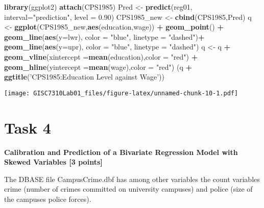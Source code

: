 \documentclass[
]{article}
\newenvironment{Shaded}{\begin{snugshade}}{\end{snugshade}}
\newcommand{\DataTypeTok}[1]{\textcolor[rgb]{0.13,0.29,0.53}{#1}}
\newcommand{\FloatTok}[1]{\textcolor[rgb]{0.00,0.00,0.81}{#1}}
\newcommand{\KeywordTok}[1]{\textcolor[rgb]{0.13,0.29,0.53}{\textbf{#1}}}
\newcommand{\NormalTok}[1]{#1}
\newcommand{\OperatorTok}[1]{\textcolor[rgb]{0.81,0.36,0.00}{\textbf{#1}}}
\newcommand{\StringTok}[1]{\textcolor[rgb]{0.31,0.60,0.02}{#1}}
\begin{document}
\begin{Shaded}
\begin{Highlighting}[]
\KeywordTok{library}\NormalTok{(ggplot2)}
\KeywordTok{attach}\NormalTok{(CPS1985)}
\NormalTok{Pred <-}\StringTok{ }\KeywordTok{predict}\NormalTok{(reg01, }\DataTypeTok{interval=}\StringTok{"prediction"}\NormalTok{, }\DataTypeTok{level =} \FloatTok{0.90}\NormalTok{)}
\NormalTok{CPS1985_new <-}\StringTok{ }\KeywordTok{cbind}\NormalTok{(CPS1985,Pred)}
\NormalTok{q <-}\StringTok{ }\KeywordTok{ggplot}\NormalTok{(CPS1985_new,}\KeywordTok{aes}\NormalTok{(education,wage)) }\OperatorTok{+}\StringTok{ }\KeywordTok{geom_point}\NormalTok{() }\OperatorTok{+}\StringTok{ }
\StringTok{  }\KeywordTok{geom_line}\NormalTok{(}\KeywordTok{aes}\NormalTok{(}\DataTypeTok{y=}\NormalTok{lwr), }\DataTypeTok{color =} \StringTok{"blue"}\NormalTok{, }\DataTypeTok{linetype =} \StringTok{"dashed"}\NormalTok{)}\OperatorTok{+}
\StringTok{  }\KeywordTok{geom_line}\NormalTok{(}\KeywordTok{aes}\NormalTok{(}\DataTypeTok{y=}\NormalTok{upr), }\DataTypeTok{color =} \StringTok{"blue"}\NormalTok{, }\DataTypeTok{linetype =} \StringTok{"dashed"}\NormalTok{)}
\NormalTok{q <-}\StringTok{ }\NormalTok{q }\OperatorTok{+}\StringTok{ }\KeywordTok{geom_vline}\NormalTok{(}\DataTypeTok{xintercept =}\KeywordTok{mean}\NormalTok{(education),}\DataTypeTok{color =} \StringTok{"red"}\NormalTok{) }\OperatorTok{+}\StringTok{ }
\StringTok{  }\KeywordTok{geom_hline}\NormalTok{(}\DataTypeTok{yintercept =}\KeywordTok{mean}\NormalTok{(wage),}\DataTypeTok{color =} \StringTok{"red"}\NormalTok{)}
\NormalTok{(q }\OperatorTok{+}\StringTok{ }\KeywordTok{ggtitle}\NormalTok{(}\StringTok{'CPS1985:Education Level against Wage'}\NormalTok{))}
\end{Highlighting}
\end{Shaded}

\texttt{[image: GISC7310Lab01\_files/figure-latex/unnamed-chunk-10-1.pdf]}

\hypertarget{task-4}{%
\section{Task 4}\label{task-4}}

\textbf{Calibration and Prediction of a Bivariate Regression Model with
Skewed Variables {[}3 points{]}}

The DBASE file CampusCrime.dbf has among other variables the count
variables crime (number of crimes committed on university campuses) and
police (size of the campuses police forces).
\end{document}
